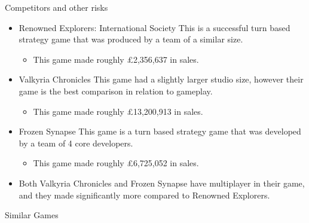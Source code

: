 \documentclass{beamer}
\begin{document}
\begin{frame}{Competitors and other risks}
	\begin{itemize}
		\item Renowned Explorers: International Society
		This is a successful turn based strategy game that was produced by a team of a similar size. \pause
		\begin{itemize}
			\item This game made roughly \pounds 2,356,637 in sales. \pause
		\end{itemize}
		
		\item Valkyria Chronicles
		This game had a slightly larger studio size, however their game is the best comparison in relation to gameplay. \pause
		\begin{itemize}
			\item This game made roughly \pounds 13,200,913 in sales. \pause
		\end{itemize}
		
		
		\item Frozen Synapse
		This game is a turn based strategy game that was developed by a team of 4 core developers. \pause
		\begin{itemize}
			\item This game made roughly \pounds 6,725,052 in sales. \pause
		\end{itemize}
		
		\item Both Valkyria Chronicles and Frozen Synapse have multiplayer in their game, and they made significantly more compared to Renowned Explorers.
	\end{itemize}

	
\end{frame}

\begin{frame}{Similar Games}
\end{frame}
\end{document}
